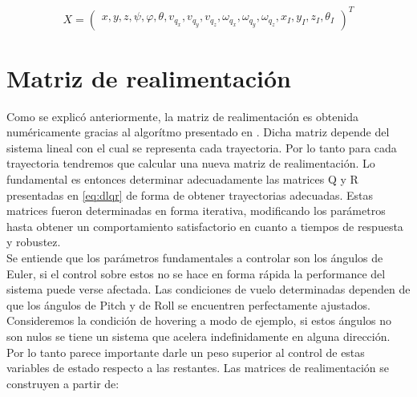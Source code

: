 \documentclass[main]{subfiles}
\begin{document}
\begin{equation}
\label{eq:controled}
X = \left(\begin{array}{c}
x,y,z,\psi,\varphi,\theta,v_{q_x},v_{q_y},v_{q_z},\omega_{q_x},\omega_{q_y},\omega_{q_z},x_I,y_I,z_I,\theta_I
\end{array}\right)^T
\end{equation}

\section{Matriz de realimentaci\'on}

Como se explic\'o anteriormente, la matriz de realimentaci\'on es obtenida num\'ericamente gracias al algor\'itmo presentado en \cite{bib:lqr-discreto}. Dicha matriz depende del sistema lineal con el cual se representa cada trayectoria. Por lo tanto para cada trayectoria tendremos que calcular una nueva matriz de realimentaci\'on. Lo fundamental es entonces determinar adecuadamente las matrices Q y R presentadas en \ref{eq:dlqr} de forma de obtener trayectorias adecuadas. Estas matrices fueron determinadas en forma iterativa, modificando los par\'ametros hasta obtener un comportamiento satisfactorio en cuanto a tiempos de respuesta y robustez.\\

Se entiende que los par\'ametros fundamentales a controlar son los \'angulos de Euler, si el control sobre estos no se hace en forma r\'apida la performance del sistema puede verse afectada.  Las condiciones de vuelo determinadas dependen de que los \'angulos de Pitch y de Roll se encuentren perfectamente ajustados. Consideremos la condici\'on de hovering a modo de ejemplo, si estos \'angulos no son nulos se tiene un sistema que acelera indefinidamente en alguna direcci\'on. Por lo tanto parece importante darle un peso superior al control de estas variables de estado respecto a las restantes. Las matrices de realimentaci\'on se construyen a partir de:
\end{document}
